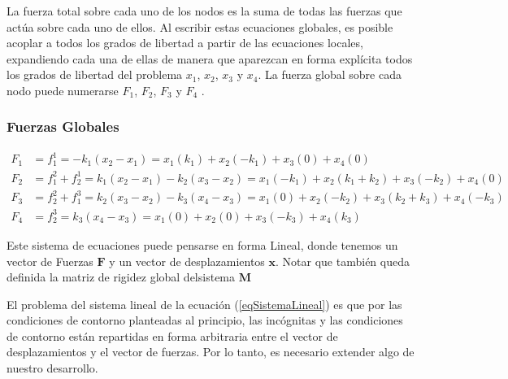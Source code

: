 
La fuerza total sobre cada uno de los nodos es la suma de todas las fuerzas que actúa sobre cada
uno de ellos. Al escribir estas ecuaciones globales, es posible acoplar a todos los grados de
libertad a partir de las ecuaciones locales, expandiendo cada una de ellas de manera que
aparezcan en forma explícita todos los grados de libertad del problema $x_1$, $x_2$, $x_3$ y
$x_4$. La fuerza global sobre cada nodo puede numerarse $F_1$, $F_2$, $F_3$ y $F_4$ .

\mode*

\begin{frame}[label=FrameFuerzasGlobales]
  \frametitle<presentation>{Fuerzas Globales}

  \begin{figure}
  \end{figure}
%
 \tiny 
  \begin{equation}\label{EqSistemaLinealExpandido}
    \begin{aligned}
      F_1 &= f_1^1  = -k_1( x_2-x_1) =
                   x_1 (k_1) + x_2(-k_1)+ x_3(0) + x_4(0)\\
      F_2 &= f_1^2 + f_2^1 = k_1( x_2-x_1) -k_2(x_3 - x_2) = 
                   x_1 (-k_1) + x_2(k_1+k_2)+ x_3(-k_2) + x_4(0)\\
      F_3 &= f_2^2 + f_1^3 = k_2( x_3-x_2) - k_3 (x_4 - x_3) = 
                    x_1 (0) + x_2(-k_2)+ x_3(k_2 + k_3) + x_4(-k_3)\\
      F_4 &= f_2^3 = k_3( x_4-x_3)=
                     x_1 (0) + x_2(0)+ x_3(-k_3) + x_4(k_3)
    \end{aligned}
  \end{equation}
%
\end{frame}


Este sistema de ecuaciones puede pensarse en forma Lineal, donde tenemos un
vector de Fuerzas $\mathbf{F}$  y un vector de desplazamientos $\mathbf{x}$. Notar que también
queda definida la matriz de rigidez global delsistema $\mathbf{M}$

El problema del  sistema lineal de la ecuación (\ref{eqSistemaLineal})
es que por las condiciones de contorno
planteadas al principio, las incógnitas y las condiciones de contorno están
repartidas en forma arbitraria entre el vector de desplazamientos y el vector
de fuerzas. Por lo tanto, es necesario extender algo de nuestro desarrollo.


